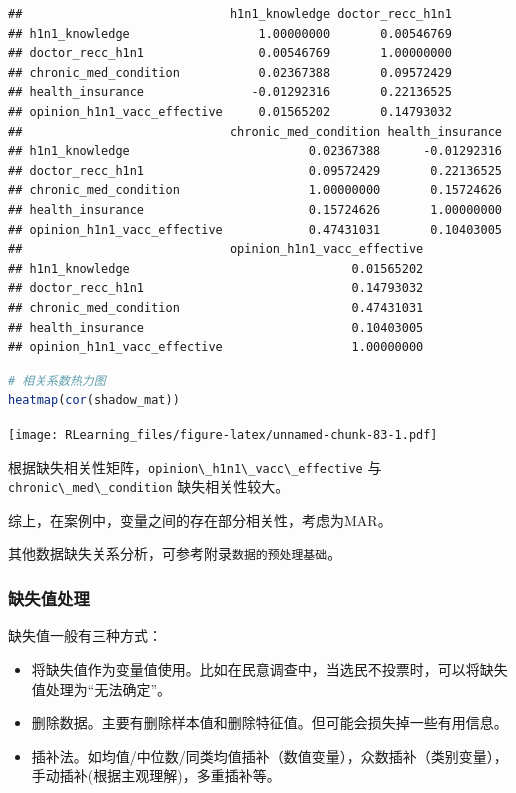 \documentclass[]{ctexbook}
\providecommand{\tightlist}{%
  \setlength{\itemsep}{0pt}\setlength{\parskip}{0pt}}
\newcommand{\passthrough}[1]{#1}
\begin{document}
\begin{lstlisting}
##                             h1n1_knowledge doctor_recc_h1n1
## h1n1_knowledge                  1.00000000       0.00546769
## doctor_recc_h1n1                0.00546769       1.00000000
## chronic_med_condition           0.02367388       0.09572429
## health_insurance               -0.01292316       0.22136525
## opinion_h1n1_vacc_effective     0.01565202       0.14793032
##                             chronic_med_condition health_insurance
## h1n1_knowledge                         0.02367388      -0.01292316
## doctor_recc_h1n1                       0.09572429       0.22136525
## chronic_med_condition                  1.00000000       0.15724626
## health_insurance                       0.15724626       1.00000000
## opinion_h1n1_vacc_effective            0.47431031       0.10403005
##                             opinion_h1n1_vacc_effective
## h1n1_knowledge                               0.01565202
## doctor_recc_h1n1                             0.14793032
## chronic_med_condition                        0.47431031
## health_insurance                             0.10403005
## opinion_h1n1_vacc_effective                  1.00000000
\end{lstlisting}

\begin{lstlisting}[language=R]
# 相关系数热力图
heatmap(cor(shadow_mat))
\end{lstlisting}

\texttt{[image: RLearning\_files/figure-latex/unnamed-chunk-83-1.pdf]}

根据缺失相关性矩阵，\passthrough{\lstinline!opinion\_h1n1\_vacc\_effective!} 与 \passthrough{\lstinline!chronic\_med\_condition!} 缺失相关性较大。

综上，在案例中，变量之间的存在部分相关性，考虑为MAR。

其他数据缺失关系分析，可参考附录\passthrough{\lstinline!数据的预处理基础!}。

\hypertarget{ux7f3aux5931ux503cux5904ux7406}{%
\subsubsection{缺失值处理}\label{ux7f3aux5931ux503cux5904ux7406}}

缺失值一般有三种方式：

\begin{itemize}
\tightlist
\item
  将缺失值作为变量值使用。比如在民意调查中，当选民不投票时，可以将缺失值处理为``无法确定''。
\item
  删除数据。主要有删除样本值和删除特征值。但可能会损失掉一些有用信息。
\item
  插补法。如均值/中位数/同类均值插补（数值变量），众数插补（类别变量），手动插补(根据主观理解)，多重插补等。
\end{itemize}
\end{document}
